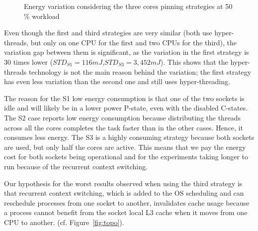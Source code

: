 \begin{figure}
    \caption{Energy variation considering the three cores pinning strategies at 50\,\% workload}\label{fig:cores-pinning}
\end{figure}

Even though the first and third strategies are very similar (both use hyper-threads, but only on one CPU for the first and two CPUs for the third), the variation gap between them is significant, as the variation in the first strategy is 30 times lower ($STD_{S1}=116 mJ$,$STD_{S3}=3,452 mJ$).
This shows that the hyper-threads technology is not the main reason behind the variation; the first strategy has even less variation than the second one and still uses hyper-threading.

The reason for the \textsf{S1} low energy consumption is that one of the two sockets is idle and will likely be in a lower power P-state, even with the disabled C-states.
The \textsf{S2} case reports low energy consumption because distributing the threads across all the cores completes the task faster than in the other cases.
Hence, it consumes less energy.
The \textsf{S3} is a highly consuming strategy because both sockets are used, but only half the cores are active.
This means that we pay the energy cost for both sockets being operational and for the experiments taking longer to run because of the recurrent context switching.

Our hypothesis for the worst results observed when using the third strategy is that recurrent context switching, which is added to the OS scheduling and can reschedule processes from one socket to another, invalidates cache usage because a process cannot benefit from the socket local L3 cache when it moves from one CPU to another. (cf. Figure~\ref{fig:topo}).

